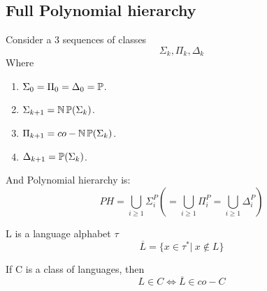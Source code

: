 \subsection{Full Polynomial hierarchy}

\begin{definition}
	Consider a 3 sequences of classes
	\[ \Sigma_k, \Pi_k, \Delta_k \]
	Where
	\begin{enumerate}
		\item $\Sigma_0 = \Pi_0 = \Delta_0 = \operatorname{\mathbb{P}}$.
		\item $\Sigma_{k + 1} = \operatorname{\operatorname{\mathbb{N}}\mathbb{P}}(\Sigma_k)$.
		\item $\Pi_{k + 1} = co-\operatorname{\operatorname{\mathbb{N}}\mathbb{P}}(\Sigma_k)$.
		\item $\Delta_{k + 1} = \operatorname{\mathbb{P}}(\Sigma_k)$.
	\end{enumerate}

	And Polynomial hierarchy is:
	\[ PH = \bigcup_{i \geq 1} \Sigma_i^P ( = \bigcup_{i \geq 1} \Pi_i^P = \bigcup_{i \geq 1} \Delta_i^P) \]

\end{definition}

\begin{note}
	L is a language alphabet $\tau$
	\[ \overline{L} = \{ x \in \tau^{\ast} |\ x \notin L \} \]

	If C is a class of languages, then
	\[ L \in C \iff \overline{L} \in co-C \]
\end{note}

